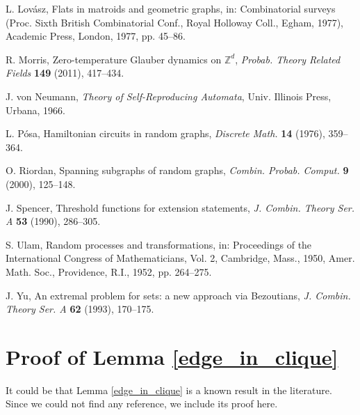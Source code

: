 \documentclass[hidelinks, 11pt]{article}
\theoremstyle{plain}
\theoremstyle{definition}
\begin{document}
\begin{thebibliography}{99}

 {\sc L.  Lov\'{a}sz}, Flats in matroids and geometric graphs, in:  Combinatorial surveys (Proc. Sixth British Combinatorial Conf., Royal Holloway Coll., Egham, 1977),  Academic Press, London, 1977, pp. 45--86.

 {\sc R. Morris}, Zero-temperature Glauber dynamics on $\mathbb{Z}^d$, {\sl Probab. Theory Related Fields}  {\bf 149} (2011), 417--434.

 {\sc J. von Neumann}, {\sl Theory of Self-Reproducing Automata}, Univ. Illinois Press, Urbana, 1966.

 {\sc L.  P\'{o}sa}, Hamiltonian circuits in random graphs, {\sl Discrete Math.}  {\bf 14} (1976), 359--364.

 {\sc O. Riordan}, Spanning subgraphs of random graphs, {\sl Combin. Probab. Comput.} {\bf 9} (2000), 125--148.

 {\sc J. Spencer}, Threshold functions for extension statements, {\sl  J. Combin. Theory Ser. A}  {\bf 53} (1990), 286--305.

 {\sc S. Ulam}, Random processes and transformations, in: Proceedings of the International Congress of Mathematicians, Vol. 2, Cambridge, Mass., 1950,  Amer. Math. Soc., Providence, R.I., 1952, pp. 264--275.

 {\sc  J.  Yu}, An extremal problem for sets: a new approach via Bezoutians,  {\sl J. Combin. Theory Ser. A}   {\bf 62} (1993), 170--175.


\end{thebibliography}



\appendix\section{Proof of Lemma \ref{edge_in_clique}}\label{appen}



It could be that  Lemma \ref{edge_in_clique}  is a known result in the  literature.  Since we  could not  find any reference, we include its proof here.
\end{document}
